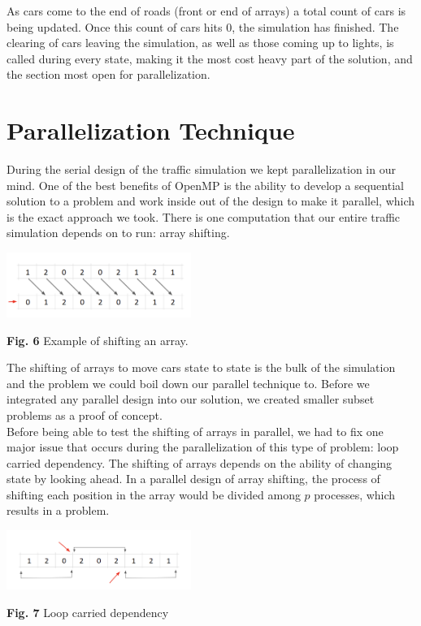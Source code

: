 \documentclass[conference]{IEEEtran}
\begin{document}
\hspace*{.2cm} As cars come to the end of roads (front or end of arrays) a total count of cars is being updated. Once this count of cars hits 0, the simulation has finished. The clearing of cars leaving the simulation, as well as those coming up to lights, is called during every state, making it the most cost heavy part of the solution, and the section most open for parallelization. 


\section{Parallelization Technique}
During the serial design of the traffic simulation we kept parallelization in our mind. One of the best benefits of OpenMP is the ability to develop a sequential solution to a problem and work inside out of the design to make it parallel, which is the exact approach we took. There is one computation that our entire traffic simulation depends on to run: array shifting. 

\includegraphics[width=0.45\textwidth]{arrayShift}
\begin{center}
	\textbf{Fig. 6} Example of shifting an array. \\
\end{center}

The shifting of arrays to move cars state to state is the bulk of the simulation and the problem we could boil down our parallel technique to. Before we integrated any parallel design into our solution, we created smaller subset problems as a proof of concept.  \\

\hspace*{.2cm} Before being able to test the shifting of arrays in parallel, we had to fix one major issue that occurs during the parallelization of this type of problem: loop carried dependency. The shifting of arrays depends on the ability of changing state by looking ahead. In a parallel design of array shifting, the process of shifting each position in the array would be divided among $p$ processes, which results in a problem.

\includegraphics[width=0.45\textwidth]{dependency}
\begin{center}
	\textbf{Fig. 7} Loop carried dependency \\
\end{center}
\end{document}
